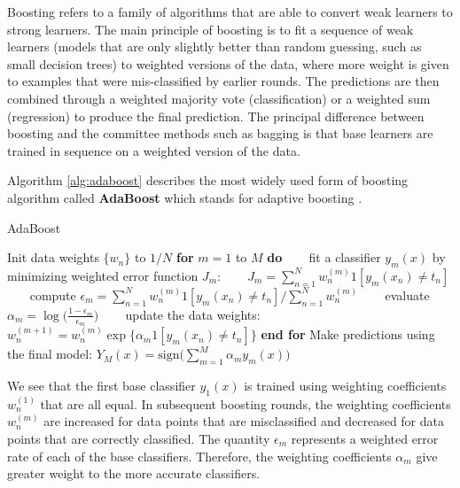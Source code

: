 Boosting refers to a family of algorithms that are able to convert weak learners to strong learners. The main principle of boosting is to fit a sequence of weak learners (models that are only slightly better than random guessing, such as small decision trees) to weighted versions of the data, where more weight is given to examples that were mis-classified by earlier rounds. The predictions are then combined through a weighted majority vote (classification) or a weighted sum (regression) to produce the final prediction. The principal difference between boosting and the committee methods such as bagging is that base learners are trained in sequence on a weighted version of the data.   

Algorithm \ref{alg:adaboost} describes the most widely used form of boosting algorithm called \textbf{AdaBoost} which stands for adaptive boosting \cite{Freund97}. 

\begin{algorithm}
\caption{AdaBoost}
\label{alg:adaboost}
\begin{algorithmic}[1]
\STATE Init data weights $\{w_n\}$ to $1/N$ 
\STATE \textbf{for} $m = 1$ to $M$ \textbf{do}  
\STATE ~~~ fit a classifier $y_m(x)$ by minimizing weighted error function $J_m$:
\STATE ~~~ $J_m = \sum_{n=1}^{N} w_{n}^{(m)}1[y_m(x_n) \neq t_n]$
\STATE ~~~ compute $\epsilon_m = \sum_{n=1}^{N} w_{n}^{(m)}1[y_m(x_n) \neq t_n] / \sum_{n=1}^{N}w_{n}^{(m)}$
\STATE ~~~ evaluate $\alpha_m = \log \big(\frac{1-\epsilon_m}{\epsilon_m}\big)$
\STATE ~~~ update the data weights: $w_{n}^{(m+1)} = w_{n}^{(m)}\exp\{\alpha_m 1[y_m(x_n) \neq t_n]\}$
\STATE \textbf{end for}
\STATE Make predictions using the final model: $Y_M(x)=\mathrm{sign}\bigg(\sum_{m=1}^{M}\alpha_m y_m(x)\bigg)$ 
\end{algorithmic}
\end{algorithm}

We see that the first base classifier $y_1(x)$ is trained using weighting coefficients $w_{n}^{(1)}$ that are all equal. In subsequent boosting rounds, the weighting coefficients $w_{n}^{(m)}$ are increased for data points that are misclassified and decreased for data points that are correctly classified. The quantity $\epsilon_m$ represents a weighted error rate of each of the base classifiers. Therefore, the weighting coefficients $\alpha_m$ give greater weight to the more accurate classifiers.\\

